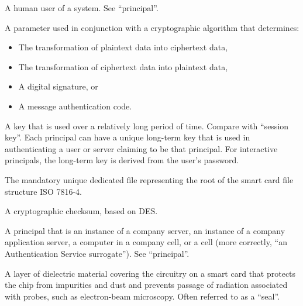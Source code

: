 \begin{htmllist}
 A human user of a system. See ``principal''.

 \item[Key]
   
 A parameter used in conjunction with a cryptographic algorithm that
 determines:

 \begin{itemize}
   \item The transformation of plaintext data into ciphertext data,
   \item The transformation of ciphertext data into plaintext data,
   \item A digital signature, or
   \item A message authentication code.
 \end{itemize}

 \item[Long-term key]
  
 A key that is used over a relatively long period of time. Compare with
 ``session key''. Each principal can have a unique long-term key that is
 used in authenticating a user or server claiming to be that principal.
 For interactive principals, the long-term key is derived from the user's
 password.

 \item[Master file]
  
 The mandatory unique dedicated file representing the root of the smart
 card file structure ISO 7816-4.

 \item[Message authentication code (MAC)]
  
 A cryptographic checksum, based on DES.

 \item[Noninteractive principal]
  
 A principal that is an instance of a company server, an instance of a
 company application server, a computer in a company cell, or a cell (more
 correctly, ``an Authentication Service surrogate''). See ``principal''.

 \item[Passivation layer]
  
 A layer of dielectric material covering the circuitry on a smart card
 that protects the chip from impurities and dust and prevents passage of
 radiation associated with probes, such as electron-beam microscopy. Often
 referred to as a ``seal''.

 \item[Password]
  

\end{htmllist}
